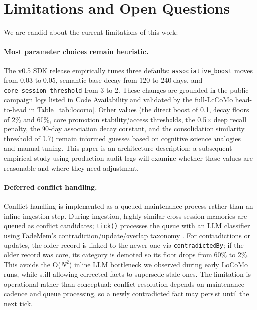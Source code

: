 \documentclass[11pt,a4paper]{article}
\begin{document}
\section{Limitations and Open Questions}
\label{sec:limitations}

We are candid about the current limitations of this work:

\paragraph{Most parameter choices remain heuristic.} The v0.5 SDK release empirically tunes three defaults: \texttt{associative\_boost} moves from 0.03 to 0.05, semantic base decay from 120 to 240 days, and \texttt{core\_session\_threshold} from 3 to 2. These changes are grounded in the public campaign logs listed in Code Availability and validated by the full-LoCoMo head-to-head in Table~\ref{tab:locomo}. Other values (the direct boost of 0.1, decay floors of 2\% and 60\%, core promotion stability/access thresholds, the 0.5$\times$ deep recall penalty, the 90-day association decay constant, and the consolidation similarity threshold of 0.7) remain informed guesses based on cognitive science analogies and manual tuning. This paper is an architecture description; a subsequent empirical study using production audit logs will examine whether these values are reasonable and where they need adjustment.

\paragraph{Deferred conflict handling.} Conflict handling is implemented as a queued maintenance process rather than an inline ingestion step. During ingestion, highly similar cross-session memories are queued as conflict candidates; \texttt{tick()} processes the queue with an LLM classifier using FadeMem's contradiction/update/overlap taxonomy \citep{wei2026fademem}. For contradictions or updates, the older record is linked to the newer one via \texttt{contradictedBy}; if the older record was core, its category is demoted so its floor drops from 60\% to 2\%. This avoids the O($N^2$) inline LLM bottleneck we observed during early LoCoMo runs, while still allowing corrected facts to supersede stale ones. The limitation is operational rather than conceptual: conflict resolution depends on maintenance cadence and queue processing, so a newly contradicted fact may persist until the next tick.
\end{document}
